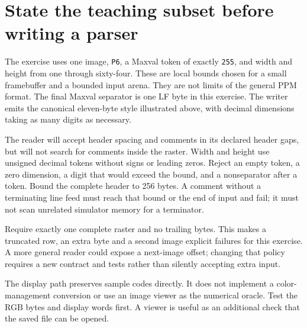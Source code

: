 \section{State the teaching subset before writing a parser}
The exercise uses one image, \texttt{P6}, a Maxval token of exactly \texttt{255}, and
width and height from one through sixty-four. These are local bounds chosen for a small
framebuffer and a bounded input arena. They are not limits of the general PPM format.
The final Maxval separator is one LF byte in this exercise. The writer emits the
canonical eleven-byte style illustrated above, with decimal dimensions taking as many
digits as necessary.

The reader will accept header spacing and comments in its declared header gaps, but
will not search for comments inside the raster. Width and height use unsigned decimal
tokens without signs or leading zeros. Reject an empty token, a zero dimension, a digit
that would exceed the bound, and a nonseparator after a token. Bound the complete header
to 256 bytes. A comment without a terminating line feed must reach that bound or the
end of input and fail; it must not scan unrelated simulator memory for a terminator.

Require exactly one complete raster and no trailing bytes. This makes a truncated row,
an extra byte and a second image explicit failures for this exercise. A more general
reader could expose a next-image offset; changing that policy requires a new contract
and tests rather than silently accepting extra input.

The display path preserves sample codes directly. It does not implement a color-management
conversion or use an image viewer as the numerical oracle. Test the RGB bytes and display
words first. A viewer is useful as an additional check that the saved file can be opened.
